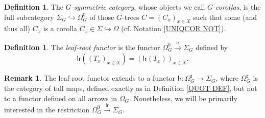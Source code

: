 \documentclass[a4paper,10pt
,draft
]{article}%
\numberwithin{equation}{section}
\numberwithin{figure}{section}
\theoremstyle{definition} %
\newtheorem{definition}[equation]{Definition}%
\newtheorem{remark}[equation]{Remark}%
\newcommand{\1}{\ensuremath{\mathbbm 1}}%
\begin{document}
\begin{definition}
	The \textit{$G$-symmetric category},
	whose objects we call \textit{$G$-corollas}, is the full subcategory 
	$\Sigma_G \hookrightarrow \Omega_{G}^0$ of those $G$-trees
	$C = (C_x)_{x \in X}$ such that some (and thus all) $C_x$ is a corolla $C_x \in \Sigma \hookrightarrow \Omega$
	(cf. Notation \ref{UNIQCOR NOT}).
\end{definition}


\begin{definition}
	The \textit{leaf-root functor} is the functor $\Omega_{G}^0 \xrightarrow{\mathsf{lr}} \Sigma_G$ defined by 
\[
	\mathsf{lr}\left((T_x)_{x \in X}\right)=
	\left(\mathsf{lr}(T_x)\right)_{x \in X}.
\]
\end{definition}


\begin{remark}
	The leaf-root functor extends 
	to a functor $\mathsf{lr} \colon \Omega^{\mathsf{t}}_G \to \Sigma_G$, 
	where $\Omega^{\mathsf{t}}_G$ is the category of tall maps, defined exactly as in Definition \ref{QUOT DEF}, but not to a functor defined on all arrows in $\Omega_G$.
	Nonetheless, we will be primarily interested in the 
 restriction  
	$\Omega_{G}^0 \xrightarrow{\mathsf{lr}} \Sigma_G$.
\end{remark}
\end{document}
